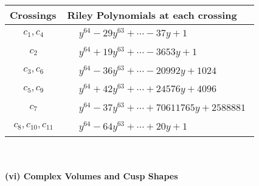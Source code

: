 \documentclass[1p]{elsarticle_modified}
\theoremstyle{definition}
\begin{document}
\begin{tabular}{m{50pt}|m{274pt}}
Crossings & \hspace{64pt}Riley Polynomials at each crossing \\
\hline $$\begin{aligned}c_{1},c_{4}\end{aligned}$$&$\begin{aligned}
&y^{64}-29 y^{63}+\cdots-37 y+1
\end{aligned}$\\
\hline $$\begin{aligned}c_{2}\end{aligned}$$&$\begin{aligned}
&y^{64}+19 y^{63}+\cdots-3653 y+1
\end{aligned}$\\
\hline $$\begin{aligned}c_{3},c_{6}\end{aligned}$$&$\begin{aligned}
&y^{64}-36 y^{63}+\cdots-20992 y+1024
\end{aligned}$\\
\hline $$\begin{aligned}c_{5},c_{9}\end{aligned}$$&$\begin{aligned}
&y^{64}+42 y^{63}+\cdots+24576 y+4096
\end{aligned}$\\
\hline $$\begin{aligned}c_{7}\end{aligned}$$&$\begin{aligned}
&y^{64}-37 y^{63}+\cdots+70611765 y+2588881
\end{aligned}$\\
\hline $$\begin{aligned}c_{8},c_{10},c_{11}\end{aligned}$$&$\begin{aligned}
&y^{64}-64 y^{63}+\cdots+20 y+1
\end{aligned}$\\
\hline
\end{tabular}\\~\\
\newpage\flushleft \textbf{(vi) Complex Volumes and Cusp Shapes}
\end{document}
